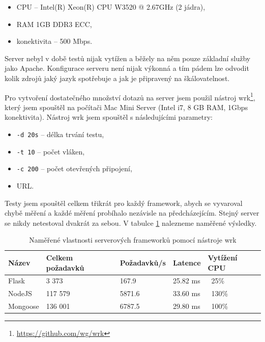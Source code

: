 \begin{itemize}
    \item CPU -- Intel(R) Xeon(R) CPU W3520  @ 2.67GHz (2 jádra),
    \item RAM 1GB DDR3 ECC,
    \item konektivita -- 500 Mbps.
\end{itemize}

Server nebyl v době testů nijak vytížen a běžely na něm pouze základní služby jako Apache. Konfigurace serveru není nijak výkonná a tím pádem lze odvodit kolik zdrojů jaký jazyk spotřebuje a jak je připravený na škálovatelnost.

Pro vytvoření dostatečného množství dotazů na server jsem použil nástroj wrk\footnote{\url{https://github.com/wg/wrk}}, který jsem spouštěl na počítači Mac Mini Server (Intel i7, 8 GB RAM, 1Gbps konektivita). Nástroj wrk jsem spouštěl s následujícími parametry:

\begin{itemize}
    \item \texttt{-d 20s} -- délka trvání testu,
    \item \texttt{-t 10} -- počet vláken,
    \item \texttt{-c 200} -- počet otevřených připojení,
    \item URL.
\end{itemize}

Testy jsem spouštěl celkem třikrát pro každý framework, abych se vyvaroval chybě měření a každé měření probíhalo nezávisle na předcházejícím. Stejný server se nikdy netestoval dvakrát za sebou. V tabulce \ref{tab:server} nalezneme naměřené výsledky.

\begin{table}[ht]
\centering
\caption{Naměřené vlastnosti serverových frameworků pomocí nástroje wrk}
\label{tab:server}
\begin{tabular}{|l|l|l|l|l|}
\hline
    Název       & Celkem požadavků  & Požadavků/s   & Latence   & Vytížení CPU\\ \hline
    Flask       & 3 373             & 167.9         & 25.82 ms  & ~25\%\\
    NodeJS      & 117 579           & 5871.6        & 33.60 ms  & ~130\%\\
    Mongoose    & 136 001           & 6787.5        & 29.80 ms  & ~100\%\\
   \hline
\end{tabular}
\end{table}


